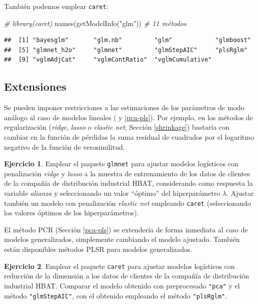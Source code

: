 \documentclass[
]{book}
\newenvironment{Shaded}{\begin{snugshade}}{\end{snugshade}}
\newcommand{\CommentTok}[1]{\textcolor[rgb]{0.56,0.35,0.01}{\textit{#1}}}
\newcommand{\FunctionTok}[1]{\textcolor[rgb]{0.00,0.00,0.00}{#1}}
\newcommand{\NormalTok}[1]{#1}
\newcommand{\StringTok}[1]{\textcolor[rgb]{0.31,0.60,0.02}{#1}}
\theoremstyle{break}
\theoremstyle{definition}
\theoremstyle{definition}
\theoremstyle{definition}
\newtheorem{exercise}{Ejercicio}[chapter]
\theoremstyle{definition}
\theoremstyle{remark}
\begin{document}
También podemos emplear \texttt{caret}:

\begin{Shaded}
\begin{Highlighting}[]
\CommentTok{\# library(caret)}
\FunctionTok{names}\NormalTok{(}\FunctionTok{getModelInfo}\NormalTok{(}\StringTok{"glm"}\NormalTok{)) }\CommentTok{\# 11 métodos}
\end{Highlighting}
\end{Shaded}

\begin{verbatim}
##  [1] "bayesglm"       "glm.nb"         "glm"            "glmboost"      
##  [5] "glmnet_h2o"     "glmnet"         "glmStepAIC"     "plsRglm"       
##  [9] "vglmAdjCat"     "vglmContRatio"  "vglmCumulative"
\end{verbatim}

\hypertarget{extensiones}{%
\subsection{Extensiones}\label{extensiones}}

Se pueden imponer restricciones a las estimaciones de los parámetros de modo análogo al caso de modelos lineales ( y \ref{pca-pls}).
Por ejemplo, en los métodos de regularización (\emph{ridge}, \emph{lasso} o \emph{elastic net}; Sección \ref{shrinkage}) bastaría con cambiar en la función de pérdidas la suma residual de cuadrados por el logaritmo negativo de la función de verosimilitud.

\begin{exercise}
\protect\hypertarget{exr:glmnet}{}{\label{exr:glmnet} }
Emplear el paquete \texttt{glmnet} para ajustar modelos logísticos con penalización \emph{ridge} y \emph{lasso} a la muestra de entrenamiento de los datos de clientes de la compañía de distribución industrial HBAT, considerando como respuesta la variable \emph{alianza} y seleccionando un valor ``óptimo'' del hiperparámetro \(\lambda\).
Ajustar también un modelo con penalización \emph{elastic net} empleando \texttt{caret} (seleccionando los valores óptimos de los hiperparámetros).
\end{exercise}

El método PCR (Sección \ref{pca-pls}) se extendería de forma inmediata al caso de modelos generalizados, simplemente cambiando el modelo ajustado.
También están disponibles métodos PLSR para modelos generalizados.

\begin{exercise}
\protect\hypertarget{exr:glm-reduccion}{}{\label{exr:glm-reduccion} }
Emplear el paquete \texttt{caret} para ajustar modelos logísticos con reducción de la dimensión a los datos de clientes de la compañía de distribución industrial HBAT. Comparar el modelo obtenido con preprocesado \texttt{"pca"} y el método \texttt{"glmStepAIC"}, con el obtenido empleando el método \texttt{"plsRglm"}.
\end{exercise}
\end{document}
